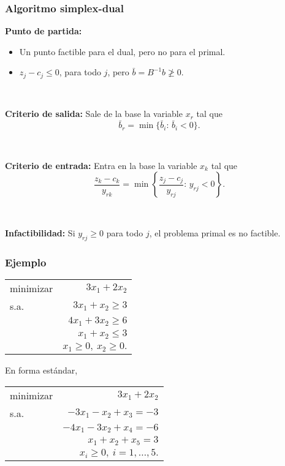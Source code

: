 \documentclass{beamer}
\begin{document}
\begin{frame}
\frametitle{Algoritmo simplex-dual}


\textbf{Punto de partida:}
\begin{itemize}
\item Un punto factible para el dual, pero no para el primal.
\item $z_j-c_j\leq 0$, para todo $j$, pero $\bar{b}=B^{-1}b\ngeqslant 0$.
\end{itemize}

\

\textbf{Criterio de salida:} Sale de la base la variable $x_r$ tal que
\[
\bar{b}_r = \min\{ \bar{b}_i:\, \bar{b}_i < 0\}.
\]

\

\textbf{Criterio de entrada:} Entra en la base la variable $x_k$ tal que 
\[
\frac{z_k-c_k}{y_{rk}} = \min\left\{ \frac{z_j-c_j}{y_{rj}}:\, y_{rj} < 0\right\}.
\]

\

\textbf{Infactibilidad:} Si $y_{rj}\geq 0$ para todo $j$, el problema primal es no factible.


\end{frame}
\begin{frame}
\frametitle{Ejemplo}

\begin{center}
\begin{tabular}{lr}
minimizar & $3x_1 + 2x_2$ \\
s.a. & $3x_1+x_2 \geq 3$    \\
	 & $4x_1 + 3x_2 \geq 6$  \\
	 & $x_1+x_2\leq 3$\\
	 & $x_1\geq 0,\ x_2\geq 0.$
\end{tabular}
\end{center}

En forma estándar,

\begin{center}
\begin{tabular}{lr}
minimizar & $3x_1 + 2x_2$ \\
s.a. & $-3x_1-x_2 + x_3 = -3$    \\
	 & $-4x_1 - 3x_2 + x_4 = -6$  \\
	 & $x_1+x_2 + x_5 = 3$\\
	 & $x_i\geq 0,\ i=1,\ldots, 5.$
\end{tabular}
\end{center}


\end{frame}
\end{document}

